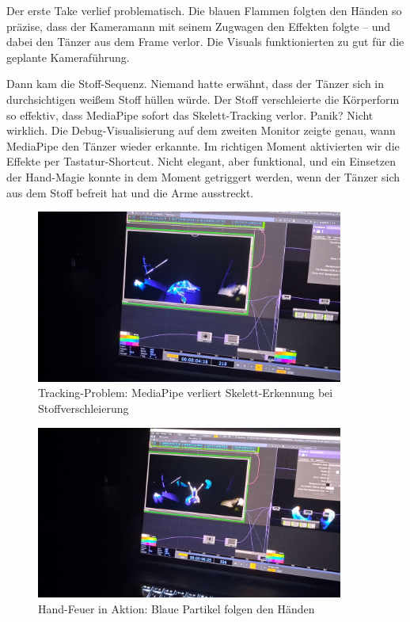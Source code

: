Der erste Take verlief problematisch. Die blauen Flammen folgten den Händen so präzise, dass der Kameramann mit seinem Zugwagen den Effekten folgte – und dabei den Tänzer aus dem Frame verlor. Die Visuals funktionierten zu gut für die geplante Kameraführung.

Dann kam die Stoff-Sequenz. Niemand hatte erwähnt, dass der Tänzer sich in durchsichtigen weißem Stoff hüllen würde. Der Stoff verschleierte die Körperform so effektiv, dass MediaPipe sofort das Skelett-Tracking verlor. Panik? Nicht wirklich. Die Debug-Visualisierung auf dem zweiten Monitor zeigte genau, wann MediaPipe den Tänzer wieder erkannte. Im richtigen Moment aktivierten wir die Effekte per Tastatur-Shortcut. Nicht elegant, aber funktional, und ein Einsetzen der Hand-Magie konnte in dem Moment getriggert werden, wenn der Tänzer sich aus dem Stoff befreit hat und die Arme ausstreckt.

\begin{figure}[h]
   \centering
   \includegraphics[width=0.9\textwidth]{images/DancerNotMediaPipeFoundCorrectlyWhenInClothOnFloor.png}
   \caption{Tracking-Problem: MediaPipe verliert Skelett-Erkennung bei Stoffverschleierung}
   \label{fig:cloth_tracking_issue}
\end{figure}

\begin{figure}[h]
   \centering
   \includegraphics[width=0.9\textwidth]{images/dancerWithHandFireViewFromKinect.png}
   \caption{Hand-Feuer in Aktion: Blaue Partikel folgen den Händen}
   \label{fig:hand_fire_action}
\end{figure}

